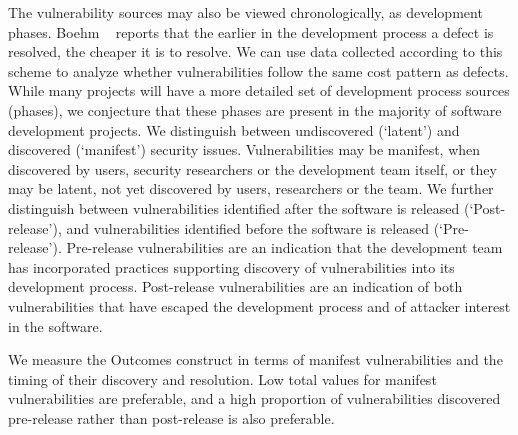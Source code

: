 The vulnerability sources may also be viewed chronologically, as development phases. Boehm ~\cite{boehm1981economics} reports that the earlier in the development process a defect is resolved, the cheaper it is to resolve. We can use data collected according to this scheme to analyze whether vulnerabilities follow the same cost pattern as defects.  While many projects will have a more detailed set of development process sources (phases), we conjecture that these phases are present in the majority of software development projects.
We distinguish between undiscovered (`latent') and discovered (`manifest') security issues.  Vulnerabilities may be manifest, when discovered by users, security researchers or the development team itself, or they may be latent, not yet discovered by users, researchers or the team. We further distinguish between vulnerabilities identified after the software is released (`Post-release'), and vulnerabilities identified before the software is released (`Pre-release'). Pre-release vulnerabilities are an indication that the development team has incorporated practices supporting discovery of vulnerabilities into its development process. Post-release vulnerabilities are an indication of both vulnerabilities that have escaped the development process and of attacker interest in the software. 

We measure the Outcomes construct in terms of manifest vulnerabilities and the  timing of their discovery and resolution. Low total values for manifest vulnerabilities are preferable, and a high proportion of vulnerabilities discovered pre-release rather than post-release is also preferable. 

